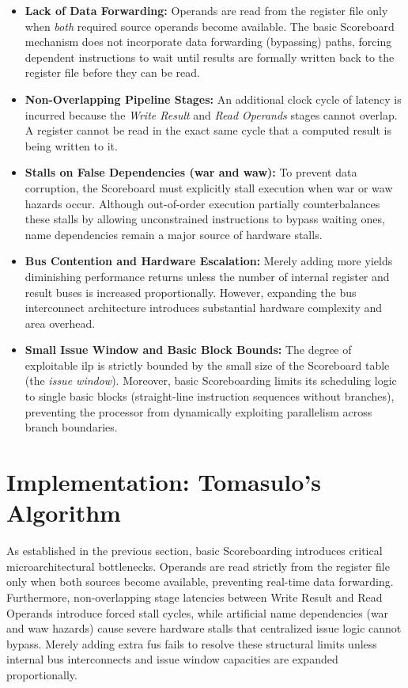 \begin{itemize}
    \item \textbf{Lack of Data Forwarding:} Operands are read from the register file only when \textit{both} required source operands become available. The basic Scoreboard mechanism does not incorporate data forwarding (bypassing) paths, forcing dependent instructions to wait until results are formally written back to the register file before they can be read.
    \item \textbf{Non-Overlapping Pipeline Stages:} An additional clock cycle of latency is incurred because the \textit{Write Result} and \textit{Read Operands} stages cannot overlap. A register cannot be read in the exact same cycle that a computed result is being written to it.
    \item \textbf{Stalls on False Dependencies (\gls{war} and \gls{waw}):} To prevent data corruption, the Scoreboard must explicitly stall execution when \gls{war} or \gls{waw} hazards occur. Although out-of-order execution partially counterbalances these stalls by allowing unconstrained instructions to bypass waiting ones, name dependencies remain a major source of hardware stalls.
    \item \textbf{Bus Contention and Hardware Escalation:} Merely adding more  yields diminishing performance returns unless the number of internal register and result buses is increased proportionally. However, expanding the bus interconnect architecture introduces substantial hardware complexity and area overhead.
    \item \textbf{Small Issue Window and Basic Block Bounds:} The degree of exploitable \gls{ilp} is strictly bounded by the small size of the Scoreboard table (the \textit{issue window}). Moreover, basic Scoreboarding limits its scheduling logic to single basic blocks (straight-line instruction sequences without branches), preventing the processor from dynamically exploiting parallelism across branch boundaries.
\end{itemize}

\section{Implementation: Tomasulo's Algorithm}
\label{sec:tomasulo_algorithm}

As established in the previous section, basic Scoreboarding introduces critical microarchitectural bottlenecks. Operands are read strictly from the register file only when both sources become available, preventing real-time data forwarding. Furthermore, non-overlapping stage latencies between Write Result and Read Operands introduce forced stall cycles, while artificial name dependencies (\gls{war} and \gls{waw} hazards) cause severe hardware stalls that centralized issue logic cannot bypass. Merely adding extra \glspl{fu} fails to resolve these structural limits unless internal bus interconnects and issue window capacities are expanded proportionally.

